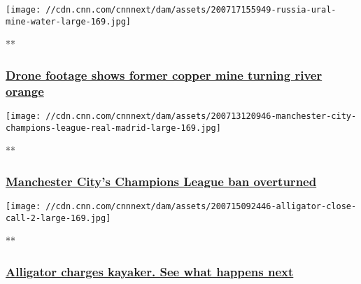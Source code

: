 \href{/videos/world/2020/07/17/russia-acid-mine-water-jba-lon-orig.cnn/video/playlists/trending-video/}{}

\texttt{[image: //cdn.cnn.com/cnnnext/dam/assets/200717155949-russia-ural-mine-water-large-169.jpg]}

**

\hypertarget{-drone-footage-shows-former-copper-mine-turning-river-orange}{%
\subsubsection{\texorpdfstring{\href{/videos/world/2020/07/17/russia-acid-mine-water-jba-lon-orig.cnn/video/playlists/trending-video/}{
Drone footage shows former copper mine turning river
orange}}{ Drone footage shows former copper mine turning river orange}}\label{-drone-footage-shows-former-copper-mine-turning-river-orange}}

\href{/videos/sports/2020/07/13/manchester-city-champions-league-ban-overturned-cas-ffp-football-uefa-spt-intl.cnn/video/playlists/trending-video/}{}

\texttt{[image: //cdn.cnn.com/cnnnext/dam/assets/200713120946-manchester-city-champions-league-real-madrid-large-169.jpg]}

**

\hypertarget{manchester-citys-champions-league-ban-overturned}{%
\subsubsection{\texorpdfstring{\href{/videos/sports/2020/07/13/manchester-city-champions-league-ban-overturned-cas-ffp-football-uefa-spt-intl.cnn/video/playlists/trending-video/}{Manchester
City's Champions League ban
overturned}}{Manchester City's Champions League ban overturned}}\label{manchester-citys-champions-league-ban-overturned}}

\href{/videos/us/2020/07/15/kayaker-alligator-close-call-jr-orig.cnn/video/playlists/trending-video/}{}

\texttt{[image: //cdn.cnn.com/cnnnext/dam/assets/200715092446-alligator-close-call-2-large-169.jpg]}

**

\hypertarget{alligator-charges-kayaker-see-what-happens-next}{%
\subsubsection{\texorpdfstring{\href{/videos/us/2020/07/15/kayaker-alligator-close-call-jr-orig.cnn/video/playlists/trending-video/}{Alligator
charges kayaker. See what happens
next}}{Alligator charges kayaker. See what happens next}}\label{alligator-charges-kayaker-see-what-happens-next}}


